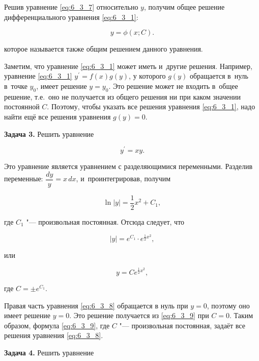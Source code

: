 Решив уравнение \eqref{eq:6_3_7} относительно $y$, получим общее решение дифференциального
уравнения \eqref{eq:6_3_1}:

\begin{equation*}
y = \phi(x; C).
\end{equation*}

\noindent
которое называется также общим решением данного уравнения.

Заметим, что уравнение \eqref{eq:6_3_1} может иметь и~другие решения.
Например, уравнение \eqref{eq:6_3_1} $y^\prime = f(x)g(y)$, у которого $g(y)$ обращается
в~нуль в~точке $y_{0}$, имеет решение $y = y_{0}$. Это решение может не входить в~общее
решение, т.е.\ оно не получается из общего решения ни при каком значении постоянной $C$.
Поэтому, чтобы указать все решения уравнения \eqref{eq:6_3_1}, надо найти ещё все решения
уравнения $g(y) = 0$.

\textbf{Задача 3.}\label{ex:6_3_3} Решить уравнение

\begin{equation}\label{eq:6_3_8}
y^\prime = xy.
\end{equation}

Это уравнение является уравнением с разделяющимися переменными. Разделив переменные:
$\dfrac{dy}{y} = x \, dx$, и~проинтегрировав, получим

\begin{equation*}
\ln |y| = \dfrac{1}{2} x^{2} + C_{1},
\end{equation*}

\noindent
где $C_{1}$ "--- произвольная постоянная. Отсюда следует, что

\begin{equation*}
|y| = e^{C_{1}} \cdot e^{\frac{1}{2}x^{2}},
\end{equation*}

\noindent
или

\begin{equation}\label{eq:6_3_9}
y = Ce^{\frac{1}{2}x^{2}},
\end{equation}

\noindent
где $C = \pm e^{C_{1}}$.

Правая часть уравнения \eqref{eq:6_3_8} обращается в нуль при $y = 0$, поэтому оно
имеет решение $y = 0$. Это решение получается из \eqref{eq:6_3_9} при $C = 0$.
Таким образом, формула \eqref{eq:6_3_9}, где $C$ "--- произвольная постоянная,
задаёт все решения уравнения \eqref{eq:6_3_8}.

\textbf{Задача 4.}\label{ex:6_3_4} Решить уравнение

